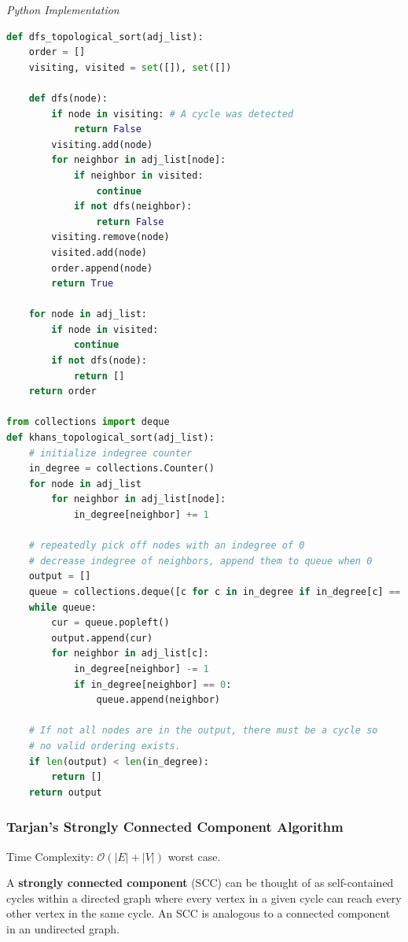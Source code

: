 \documentclass{article}
\newcommand{\bigO}{\mathcal{O}}
\begin{document}
\vspace{8pt} \emph{Python Implementation}
\begin{lstlisting}[language=Python]
def dfs_topological_sort(adj_list):
    order = []
    visiting, visited = set([]), set([])
    
    def dfs(node):
        if node in visiting: # A cycle was detected
            return False
        visiting.add(node)
        for neighbor in adj_list[node]:
            if neighbor in visited:
                continue
            if not dfs(neighbor):
                return False
        visiting.remove(node)
        visited.add(node)
        order.append(node)
        return True

    for node in adj_list:
        if node in visited:
            continue
        if not dfs(node):
            return []
    return order
    
from collections import deque
def khans_topological_sort(adj_list):
    # initialize indegree counter 
    in_degree = collections.Counter()
    for node in adj_list
        for neighbor in adj_list[node]:
            in_degree[neighbor] += 1
            
    # repeatedly pick off nodes with an indegree of 0 
    # decrease indegree of neighbors, append them to queue when 0
    output = []
    queue = collections.deque([c for c in in_degree if in_degree[c] == 0])
    while queue:
        cur = queue.popleft()
        output.append(cur)
        for neighbor in adj_list[c]:
            in_degree[neighbor] -= 1
            if in_degree[neighbor] == 0:
                queue.append(neighbor)
                
    # If not all nodes are in the output, there must be a cycle so
    # no valid ordering exists.
    if len(output) < len(in_degree):
        return []
    return output 
\end{lstlisting}
    
    \subsubsection{Tarjan's Strongly Connected Component Algorithm}
    Time Complexity: $\bigO (|E| + |V|)$ worst case.
    
    A \textbf{strongly connected component} (SCC) can be thought of as self-contained cycles within a directed graph where every vertex in a given cycle can reach every other vertex in the same cycle. An SCC is analogous to a connected component in an undirected graph.
    
\end{document}
